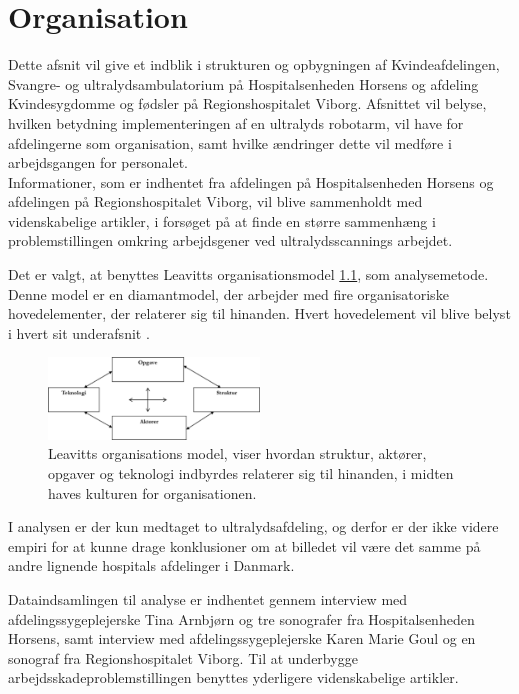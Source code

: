 \chapter{Organisation}
Dette afsnit vil give et indblik i strukturen og opbygningen af Kvindeafdelingen, Svangre- og ultralydsambulatorium på Hospitalsenheden Horsens og afdeling Kvindesygdomme og fødsler på Regionshospitalet Viborg. Afsnittet vil belyse, hvilken betydning implementeringen af en ultralyds robotarm, vil have for afdelingerne som organisation, samt hvilke ændringer dette vil medføre i arbejdsgangen for personalet. \\
Informationer, som er indhentet fra afdelingen på Hospitalsenheden Horsens og afdelingen på Regionshospitalet Viborg, vil blive sammenholdt med videnskabelige artikler, i forsøget på at finde en større sammenhæng i problemstillingen omkring arbejdsgener ved ultralydsscannings arbejdet.

Det er valgt, at benyttes Leavitts organisationsmodel \ref{LeavittModel}, som analysemetode. Denne model er en diamantmodel, der arbejder med fire organisatoriske hovedelementer, der relaterer sig til hinanden. Hvert hovedelement vil blive belyst i hvert sit underafsnit \cite{Leavitt}.

\begin{figure}[h!]\centering
	\includegraphics[width = 0.5\textwidth]{Figurer/LeavittModel}
	\caption{Leavitts organisations model, viser hvordan struktur, aktører, opgaver og teknologi indbyrdes relaterer sig til hinanden, i midten haves kulturen for organisationen.}
	\label{LeavittModel}
\end{figure}
I analysen er der kun medtaget to ultralydsafdeling, og derfor er der ikke videre empiri for at kunne drage konklusioner om at billedet vil være det samme på andre lignende hospitals afdelinger i Danmark. 

Dataindsamlingen til analyse er indhentet gennem interview med afdelingssygeplejerske Tina Arnbjørn og tre sonografer fra Hospitalsenheden Horsens, samt interview med afdelingssygeplejerske Karen Marie Goul og en sonograf fra Regionshospitalet Viborg.
Til at underbygge arbejdsskadeproblemstillingen benyttes yderligere videnskabelige artikler.

